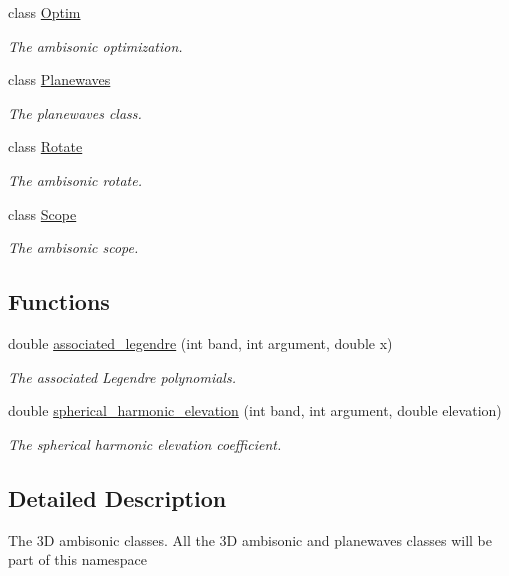 \begin{DoxyCompactItemize}
class \hyperlink{class_hoa3_d_1_1_optim}{Optim}
\begin{DoxyCompactList}\small\item\em The ambisonic optimization. \end{DoxyCompactList}\item 
class \hyperlink{class_hoa3_d_1_1_planewaves}{Planewaves}
\begin{DoxyCompactList}\small\item\em The planewaves class. \end{DoxyCompactList}\item 
class \hyperlink{class_hoa3_d_1_1_rotate}{Rotate}
\begin{DoxyCompactList}\small\item\em The ambisonic rotate. \end{DoxyCompactList}\item 
class \hyperlink{class_hoa3_d_1_1_scope}{Scope}
\begin{DoxyCompactList}\small\item\em The ambisonic scope. \end{DoxyCompactList}\end{DoxyCompactItemize}
\subsection*{Functions}
\begin{DoxyCompactItemize}
\item 
double \hyperlink{namespace_hoa3_d_af1a17fb5f135864f61a4dcf84ec65879}{associated\-\_\-legendre} (int band, int argument, double x)
\begin{DoxyCompactList}\small\item\em The associated Legendre polynomials. \end{DoxyCompactList}\item 
double \hyperlink{namespace_hoa3_d_adc1733ec44ddce995b7cb1f8d99251b5}{spherical\-\_\-harmonic\-\_\-elevation} (int band, int argument, double elevation)
\begin{DoxyCompactList}\small\item\em The spherical harmonic elevation coefficient. \end{DoxyCompactList}\end{DoxyCompactItemize}


\subsection{Detailed Description}
The 3\-D ambisonic classes. All the 3\-D ambisonic and planewaves classes will be part of this namespace 

